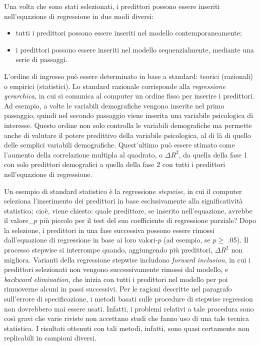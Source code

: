 \documentclass[
  11pt,
]{krantz}
\providecommand{\tightlist}{%
  \setlength{\itemsep}{0pt}\setlength{\parskip}{0pt}}
\theoremstyle{definition}
\theoremstyle{definition}
\theoremstyle{definition}
\theoremstyle{definition}
\theoremstyle{remark}
\begin{document}
Una volta che sono stati selezionati, i predittori possono essere inseriti nell'equazione di regressione in due modi diversi:

\begin{itemize}
\tightlist
\item
  tutti i predittori possono essere inseriti nel modello contemporaneamente;
\item
  i predittori possono essere inseriti nel modello sequenzialmente, mediante una serie di passaggi.
\end{itemize}

L'ordine di ingresso può essere determinato in base a standard: teorici (razionali) o empirici (statistici). Lo standard razionale corrisponde alla \emph{regressione gerarchica}, in cui si comunica al computer un ordine fisso per inserire i predittori. Ad esempio, a volte le variabili demografiche vengono inserite nel primo passaggio, quindi nel secondo passaggio viene inserita una variabile psicologica di interesse. Questo ordine non solo controlla le variabili demografiche ma permette anche di valutare il potere predittivo della variabile psicologica, al di là di quello delle semplici variabili demografiche. Quest'ultimo può essere stimato come l'aumento della correlazione multipla al quadrato, o \(\Delta R^2\), da quella della fase 1 con solo predittori demografici a quella della fase 2 con tutti i predittori nell'equazione di regressione.

Un esempio di standard statistico è la regressione \emph{stepwise}, in cui il computer seleziona l'inserimento dei predittori in base esclusivamente alla significatività statistica; cioè, viene chiesto: quale predittore, se inserito nell'equazione, avrebbe il valore\_\(p\) più piccolo per il test del suo coefficiente di regressione parziale? Dopo la selezione, i predittori in una fase successiva possono essere rimossi dall'equazione di regressione in base ai loro valori-\(p\) (ad esempio, se \(p \geq\) .05). Il processo stepwise si interrompe quando, aggiungendo più predittori, \(\Delta R^2\) non migliora. Varianti della regressione stepwise includono \emph{forward inclusion}, in cui i predittori selezionati non vengono successivamente rimossi dal modello, e \emph{backward elimination}, che inizia con tutti i predittori nel modello per poi rimuoverne alcuni in passi successivi. Per le ragioni descritte nel paragrafo sull'errore di specificazione, i metodi basati sulle procedure di stepwise regression non dovrebbero mai essere usati. Infatti, i problemi relativi a tale procedura sono così gravi che varie riviste non accettano studi che fanno uso di una tale tecnica statistica. I risultati ottenuti con tali metodi, infatti, sono quasi certamente non replicabili in campioni diversi.
\end{document}
